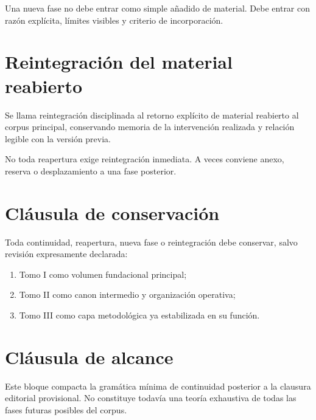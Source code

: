 \begin{observation}
Una nueva fase no debe entrar como simple añadido de material. Debe entrar con razón explícita, límites visibles y criterio de incorporación.
\end{observation}

\section{Reintegración del material reabierto}
\begin{definition}
Se llama reintegración disciplinada al retorno explícito de material reabierto al corpus principal, conservando memoria de la intervención realizada y relación legible con la versión previa.
\end{definition}

\begin{observation}
No toda reapertura exige reintegración inmediata. A veces conviene anexo, reserva o desplazamiento a una fase posterior.
\end{observation}

\section{Cláusula de conservación}
\begin{observation}
Toda continuidad, reapertura, nueva fase o reintegración debe conservar, salvo revisión expresamente declarada:
\begin{enumerate}
  \item Tomo I como volumen fundacional principal;
  \item Tomo II como canon intermedio y organización operativa;
  \item Tomo III como capa metodológica ya estabilizada en su función.
\end{enumerate}
\end{observation}

\section{Cláusula de alcance}
\begin{observation}
Este bloque compacta la gramática mínima de continuidad posterior a la clausura editorial provisional. No constituye todavía una teoría exhaustiva de todas las fases futuras posibles del corpus.
\end{observation}

